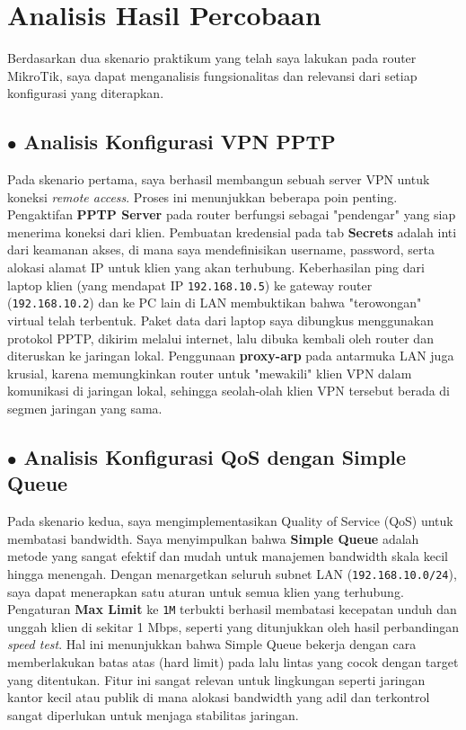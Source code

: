 \section{Analisis Hasil Percobaan}
Berdasarkan dua skenario praktikum yang telah saya lakukan pada router MikroTik, saya dapat menganalisis fungsionalitas dan relevansi dari setiap konfigurasi yang diterapkan.

\subsection*{$\bullet$ Analisis Konfigurasi VPN PPTP}
Pada skenario pertama, saya berhasil membangun sebuah server VPN untuk koneksi \textit{remote access}. Proses ini menunjukkan beberapa poin penting. Pengaktifan \textbf{PPTP Server} pada router berfungsi sebagai "pendengar" yang siap menerima koneksi dari klien. Pembuatan kredensial pada tab \textbf{Secrets} adalah inti dari keamanan akses, di mana saya mendefinisikan username, password, serta alokasi alamat IP untuk klien yang akan terhubung.
Keberhasilan ping dari laptop klien (yang mendapat IP \texttt{192.168.10.5}) ke gateway router (\texttt{192.168.10.2}) dan ke PC lain di LAN membuktikan bahwa "terowongan" virtual telah terbentuk. Paket data dari laptop saya dibungkus menggunakan protokol PPTP, dikirim melalui internet, lalu dibuka kembali oleh router dan diteruskan ke jaringan lokal. Penggunaan \textbf{proxy-arp} pada antarmuka LAN juga krusial, karena memungkinkan router untuk "mewakili" klien VPN dalam komunikasi di jaringan lokal, sehingga seolah-olah klien VPN tersebut berada di segmen jaringan yang sama.

\subsection*{$\bullet$ Analisis Konfigurasi QoS dengan Simple Queue}
Pada skenario kedua, saya mengimplementasikan Quality of Service (QoS) untuk membatasi bandwidth. Saya menyimpulkan bahwa \textbf{Simple Queue} adalah metode yang sangat efektif dan mudah untuk manajemen bandwidth skala kecil hingga menengah. Dengan menargetkan seluruh subnet LAN (\texttt{192.168.10.0/24}), saya dapat menerapkan satu aturan untuk semua klien yang terhubung.
Pengaturan \textbf{Max Limit} ke \texttt{1M} terbukti berhasil membatasi kecepatan unduh dan unggah klien di sekitar 1 Mbps, seperti yang ditunjukkan oleh hasil perbandingan \textit{speed test}. Hal ini menunjukkan bahwa Simple Queue bekerja dengan cara memberlakukan batas atas (hard limit) pada lalu lintas yang cocok dengan target yang ditentukan. Fitur ini sangat relevan untuk lingkungan seperti jaringan kantor kecil atau publik di mana alokasi bandwidth yang adil dan terkontrol sangat diperlukan untuk menjaga stabilitas jaringan.



